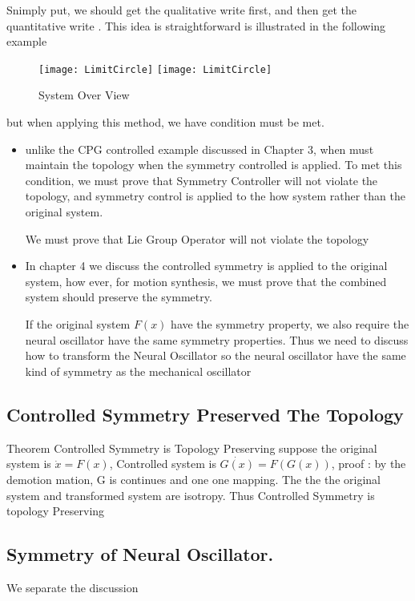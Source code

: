 Snimply put, we should get the qualitative write first, and then get the quantitative write .
This idea is straightforward is illustrated in the following example
\begin{figure}[!htbp]
  \begin{center}
    \leavevmode
    \ifpdf
      \texttt{[image: LimitCircle]}
    \else
      \texttt{[image: LimitCircle]}
    \fi
    \caption{System Over View }
    \label{fig:sysoverview}
  \end{center}
\end{figure}
but when applying this method, we have condition must be met.
\begin{itemize}
\item unlike the CPG controlled example discussed in Chapter 3, when must maintain the topology when the symmetry controlled is applied.
To met this condition, we must prove that Symmetry Controller will not violate the topology, and symmetry control is applied to the how system rather than the original system.

We must prove that Lie Group Operator will not violate the topology

\item In chapter 4 we discuss the controlled symmetry is applied to the original system, how ever, for motion synthesis, we must prove that the combined system should preserve the symmetry.

If the original system $F(x)$ have the symmetry property, we also require the neural oscillator have the same symmetry properties.
Thus we need to discuss how to transform the Neural Oscillator so the neural oscillator have the same kind of symmetry as the mechanical oscillator
\end{itemize}



\subsection{ Controlled Symmetry Preserved The Topology}

Theorem Controlled Symmetry is Topology Preserving
suppose the original system is $\dot{x}=F(x)$, Controlled system is $\dot{G(x)}=F(G(x))$,
proof :
	by the demotion mation, G is continues and one one mapping.
	The the the original system and transformed system are isotropy.
	Thus Controlled Symmetry is topology Preserving


\subsection{ Symmetry of Neural Oscillator.}
We separate the discussion

